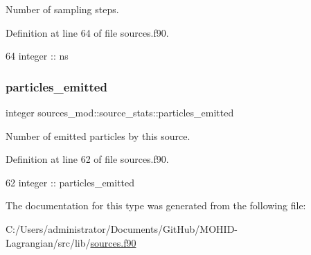 Number of sampling steps. 



Definition at line 64 of file sources.\+f90.


\begin{DoxyCode}
64         \textcolor{keywordtype}{integer} :: ns
\end{DoxyCode}
\mbox{\label{structsources__mod_1_1source__stats_a2253ced036ad1a9fee933b6b08135189}} 
\subsubsection{\texorpdfstring{particles\+\_\+emitted}{particles\_emitted}}
{\footnotesize\ttfamily integer sources\+\_\+mod\+::source\+\_\+stats\+::particles\+\_\+emitted\hspace{0.3cm}{\ttfamily [private]}}



Number of emitted particles by this source. 



Definition at line 62 of file sources.\+f90.


\begin{DoxyCode}
62         \textcolor{keywordtype}{integer} :: particles\_emitted
\end{DoxyCode}


The documentation for this type was generated from the following file\+:\begin{DoxyCompactItemize}
\item 
C\+:/\+Users/administrator/\+Documents/\+Git\+Hub/\+M\+O\+H\+I\+D-\/\+Lagrangian/src/lib/\mbox{\hyperlink{sources_8f90}{sources.\+f90}}\end{DoxyCompactItemize}
